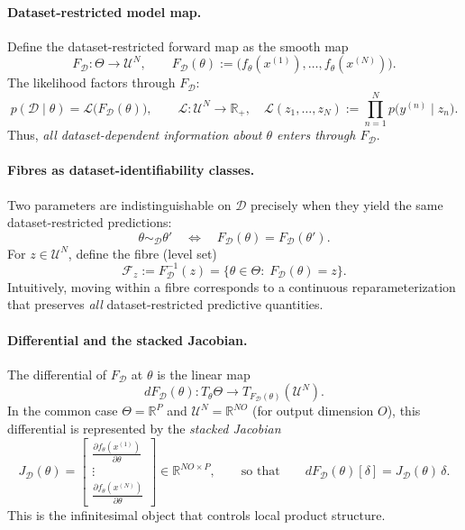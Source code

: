 \paragraph{Dataset-restricted model map.}
Define the dataset-restricted forward map as the smooth map
\begin{equation}
F_{\mathcal D}:\Theta \longrightarrow \mathcal U^N,
\qquad
F_{\mathcal D}(\theta):=
\bigl(f_\theta(x^{(1)}),\dots,f_\theta(x^{(N)})\bigr).
\label{eq:F_D_def_section}
\end{equation}
The likelihood factors through $F_{\mathcal D}$:
\[
p(\mathcal D\mid\theta)
=\mathcal L\bigl(F_{\mathcal D}(\theta)\bigr),
\qquad
\mathcal L:\mathcal U^N\to\mathbb R_+,
\quad
\mathcal L(z_1,\dots,z_N):=\prod_{n=1}^N p\bigl(y^{(n)}\mid z_n\bigr).
\]
Thus, \emph{all dataset-dependent information about $\theta$ enters through $F_{\mathcal D}$}.

\paragraph{Fibres as dataset-identifiability classes.}
Two parameters are indistinguishable on $\mathcal D$ precisely when they yield the same
dataset-restricted predictions:
\[
\theta \sim_{\mathcal D} \theta'
\quad\Longleftrightarrow\quad
F_{\mathcal D}(\theta)=F_{\mathcal D}(\theta').
\]
For $z\in \mathcal U^N$, define the fibre (level set)
\[
\mathcal F_z := F_{\mathcal D}^{-1}(z)
=\{\theta\in\Theta:\;F_{\mathcal D}(\theta)=z\}.
\]
Intuitively, moving within a fibre corresponds to a continuous reparameterization that
preserves \emph{all} dataset-restricted predictive quantities.

\paragraph{Differential and the stacked Jacobian.}
The differential of $F_{\mathcal D}$ at $\theta$ is the linear map
\[
dF_{\mathcal D}(\theta):T_\theta\Theta \longrightarrow T_{F_{\mathcal D}(\theta)}(\mathcal U^N).
\]
In the common case $\Theta=\mathbb R^P$ and $\mathcal U^N=\mathbb R^{N O}$ (for output dimension $O$),
this differential is represented by the \emph{stacked Jacobian}
\[
J_{\mathcal D}(\theta)
=
\begin{bmatrix}
\frac{\partial f_\theta(x^{(1)})}{\partial\theta}\\
\vdots\\
\frac{\partial f_\theta(x^{(N)})}{\partial\theta}
\end{bmatrix}
\in\mathbb R^{NO\times P},
\qquad\text{so that}\qquad
dF_{\mathcal D}(\theta)[\delta]=J_{\mathcal D}(\theta)\,\delta.
\]
This is the infinitesimal object that controls local product structure.


